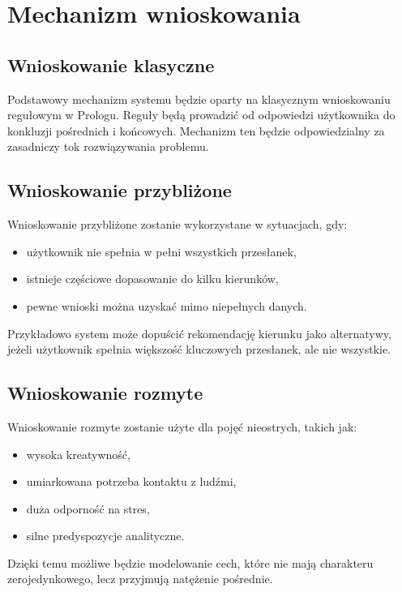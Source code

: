 \documentclass[12pt,a4paper,oneside]{article}
\begin{document}
\section{Mechanizm wnioskowania}

\subsection{Wnioskowanie klasyczne}

Podstawowy mechanizm systemu będzie oparty na klasycznym wnioskowaniu regułowym w Prologu. Reguły będą prowadzić od odpowiedzi użytkownika do konkluzji pośrednich i końcowych. Mechanizm ten będzie odpowiedzialny za zasadniczy tok rozwiązywania problemu.

\subsection{Wnioskowanie przybliżone}

Wnioskowanie przybliżone zostanie wykorzystane w sytuacjach, gdy:
\begin{itemize}[leftmargin=1.2cm]
    \item użytkownik nie spełnia w pełni wszystkich przesłanek,
    \item istnieje częściowe dopasowanie do kilku kierunków,
    \item pewne wnioski można uzyskać mimo niepełnych danych.
\end{itemize}

Przykładowo system może dopuścić rekomendację kierunku jako alternatywy, jeżeli użytkownik spełnia większość kluczowych przesłanek, ale nie wszystkie.

\subsection{Wnioskowanie rozmyte}

Wnioskowanie rozmyte zostanie użyte dla pojęć nieostrych, takich jak:
\begin{itemize}[leftmargin=1.2cm]
    \item wysoka kreatywność,
    \item umiarkowana potrzeba kontaktu z ludźmi,
    \item duża odporność na stres,
    \item silne predyspozycje analityczne.
\end{itemize}

Dzięki temu możliwe będzie modelowanie cech, które nie mają charakteru zerojedynkowego, lecz przyjmują natężenie pośrednie.
\end{document}
